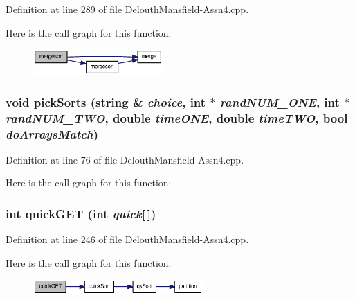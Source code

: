 Definition at line 289 of file DelouthMansfield-\/Assn4.cpp.



Here is the call graph for this function:\nopagebreak
\begin{figure}[H]
\begin{center}
\leavevmode
\includegraphics[width=140pt]{_delouth_mansfield-_assn4_8cpp_a5f5d9f539f726c766f4c454c579f2f6d_cgraph}
\end{center}
\end{figure}


\hypertarget{_delouth_mansfield-_assn4_8cpp_a37091112a4b3fb4a6b3e7e5a395bd888}{
\subsubsection[{pickSorts}]{\setlength{\rightskip}{0pt plus 5cm}void pickSorts (string \& {\em choice}, \/  int $\ast$ {\em randNUM\_\-ONE}, \/  int $\ast$ {\em randNUM\_\-TWO}, \/  double {\em timeONE}, \/  double {\em timeTWO}, \/  bool {\em doArraysMatch})}}
\label{_delouth_mansfield-_assn4_8cpp_a37091112a4b3fb4a6b3e7e5a395bd888}


Definition at line 76 of file DelouthMansfield-\/Assn4.cpp.



Here is the call graph for this function:

\hypertarget{_delouth_mansfield-_assn4_8cpp_a9c524d18ebb0b180ce26264cf9f01c33}{
\subsubsection[{quickGET}]{\setlength{\rightskip}{0pt plus 5cm}int quickGET (int {\em quick}\mbox{[}$\,$\mbox{]})}}
\label{_delouth_mansfield-_assn4_8cpp_a9c524d18ebb0b180ce26264cf9f01c33}


Definition at line 246 of file DelouthMansfield-\/Assn4.cpp.



Here is the call graph for this function:\nopagebreak
\begin{figure}[H]
\begin{center}
\leavevmode
\includegraphics[width=184pt]{_delouth_mansfield-_assn4_8cpp_a9c524d18ebb0b180ce26264cf9f01c33_cgraph}
\end{center}
\end{figure}


